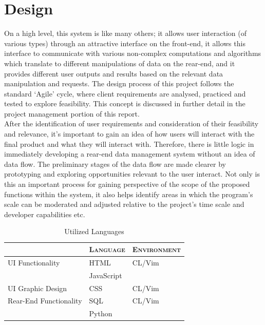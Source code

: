 \documentclass[11pt, english]{article}
\begin{document}
\newpage

\section{Design}

	On a high level, this system is like many others; it allows user interaction (of various types) through an attractive interface on the front-end, it allows this interface to communicate with various non-complex computations and algorithms which translate to different manipulations of data on the rear-end, and it provides different user outputs and results based on the relevant data manipulation and requests. The design process of this project follows the standard `Agile' cycle, where client requirements are analysed, practiced and tested to explore feasibility. This concept is discussed in further detail in the project management portion of this report.\\

	After the identification of user requirements and consideration of their feasibility and relevance, it's important to gain an idea of how users will interact with the final product and what they will interact with. Therefore, there is little logic in immediately developing a rear-end data management system without an idea of data flow. The preliminary stages of the data flow are made clearer by prototyping and exploring opportunities relevant to the user interact. Not only is this an important process for gaining perspective of the scope of the proposed functions within the system, it also helps identify areas in which the program's scale can be moderated and adjusted relative to the project's time scale and developer capabilities etc.\\

	\begin{table}[h]
		\scriptsize
		\renewcommand{\arraystretch}{1.25}
	\begin{center}
	\begin{tabular}{lll}
		& \textsc{Language} & \textsc{Environment}\\
		\hline
		UI Functionality & HTML & CL/Vim\\
		& JavaScript & \\
		UI Graphic Design & CSS & CL/Vim\\
		Rear-End Functionality & SQL & CL/Vim\\
		& Python & \\
		\hline
	\end{tabular}
		\caption{Utilized Languages}
	\end{center}
	\end{table}
\end{document}
